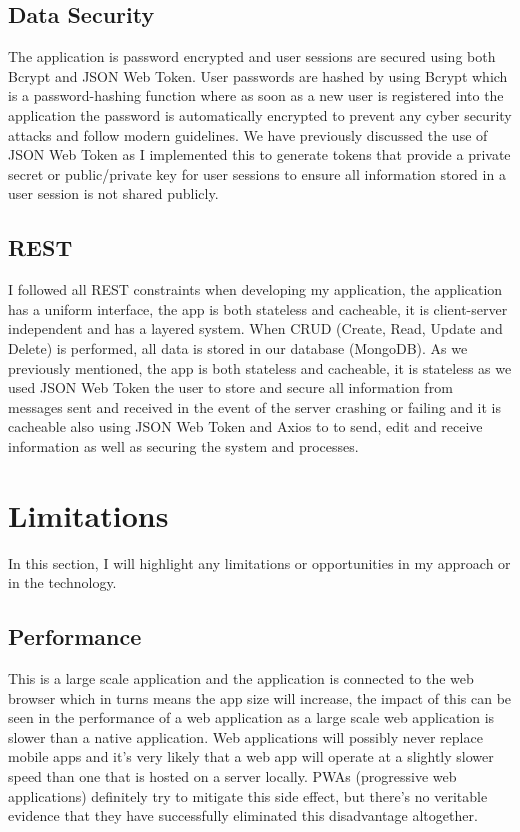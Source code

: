 \subsection{Data Security}

The application is password encrypted and user sessions are secured using both Bcrypt and JSON Web Token. User passwords are hashed by using Bcrypt which is a password-hashing function where as soon as a new user is registered into the application the password is automatically encrypted to prevent any cyber security attacks and follow modern guidelines. We have previously discussed the use of JSON Web Token as I implemented this to generate tokens that provide a private secret or public/private key for user sessions to ensure all information stored in a user session is not shared publicly.

\subsection{REST}

I followed all REST constraints when developing my application, the application has a uniform interface, the app is both stateless and cacheable, it is client-server independent and has a layered system. When CRUD (Create, Read, Update and Delete) is performed, all data is stored in our database (MongoDB). As we previously mentioned, the app is both stateless and cacheable, it is stateless as we used JSON Web Token the user to store and secure all information from messages sent and received in the event of the server crashing or failing and it is cacheable also using JSON Web Token and Axios to to send, edit and receive information as well as securing the system and processes.

\section{Limitations}

In this section, I will highlight any limitations or opportunities in my approach or in the technology.

\subsection{Performance}

This is a large scale application and the application is connected to the web browser which in turns means the app size will increase, the impact of this can be seen in the performance of a web application as a large scale web application is slower than a native application. Web applications will possibly never replace mobile apps and it’s very likely that a web app will operate at a slightly slower speed than one that is hosted on a server locally. PWAs (progressive web applications) definitely try to mitigate this side effect, but there’s no veritable evidence that they have successfully eliminated this disadvantage altogether.

